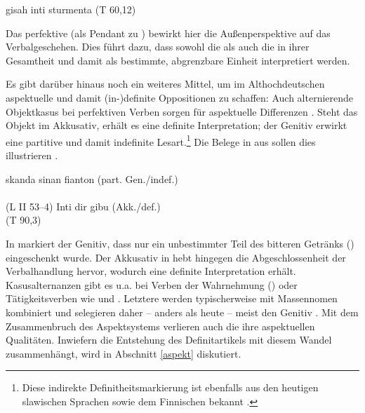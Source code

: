 \begin{exe}
	\ex \label{ex:menigi}  gisah  inti  sturmenta (T 60,12)\\ 	
\end{exe}

\noindent
Das perfektive   (als Pendant zu ) bewirkt hier die Außenperspektive auf das Verbalgeschehen. Dies führt dazu, dass sowohl die  als auch die  in ihrer Gesamtheit und damit als bestimmte, abgrenzbare Einheit interpretiert werden. 

Es gibt darüber hinaus noch ein weiteres Mittel, um im Althochdeutschen aspektuelle und damit (in-)definite Oppositionen zu schaffen: Auch alternierende Objektkasus  bei perfektiven Verben sorgen für aspektuelle  Differenzen  \parencite{Donhauser1990,Leiss1994,Abraham1997,Philippi1997}. Steht das Objekt  im Akkusativ, erhält es eine definite  Interpretation; der Genitiv erwirkt eine partitive  und damit indefinite  Lesart.\footnote{Diese indirekte Definitheitsmarkierung  ist ebenfalls aus den heutigen slawischen Sprachen sowie dem Finnischen bekannt \parencite[74]{Philippi1997}.} Die Belege in  aus \textcite[65]{Philippi1997} sollen dies illustrieren \parencite[vgl. auch][49]{Ferraresi2014}.

\begin{exe}
	\ex \label{ex:ahd-gen-akk}
		\begin{xlist}
		\ex \label{ex:ahd-gen} skanda sinan fianton   \hfill(part. Gen./indef.) \\ 
		 \\ (L II 53--4)
		\ex \label{ex:ahd-akk} Inti dir gibu   \hfill(Akk./def.) \\   (T 90,3)
		\end{xlist}
\end{exe}
\noindent
In  markiert der Genitiv, dass nur ein unbestimmter Teil des bitteren Getränks () eingeschenkt wurde. Der Akkusativ in  hebt hingegen die Abgeschlossenheit der Verbalhandlung hervor, wodurch  eine definite Interpretation erhält. Kasusalternanzen  gibt es u.a. bei Verben der Wahrnehmung () oder Tätigkeitsverben wie  und  \parencite[s.][100]{Donhauser1990}. Letztere werden typischerweise mit Massennomen  kombiniert und selegieren daher -- anders als heute --  meist den Genitiv \parencite[36]{Abraham1997}. Mit dem Zusammenbruch des Aspektsystems  verlieren auch die  ihre aspektuellen  Qualitäten. Inwiefern die Entstehung des Definitartikels  mit diesem Wandel zusammenhängt, wird in Abschnitt \ref{aspekt} diskutiert. 
 
